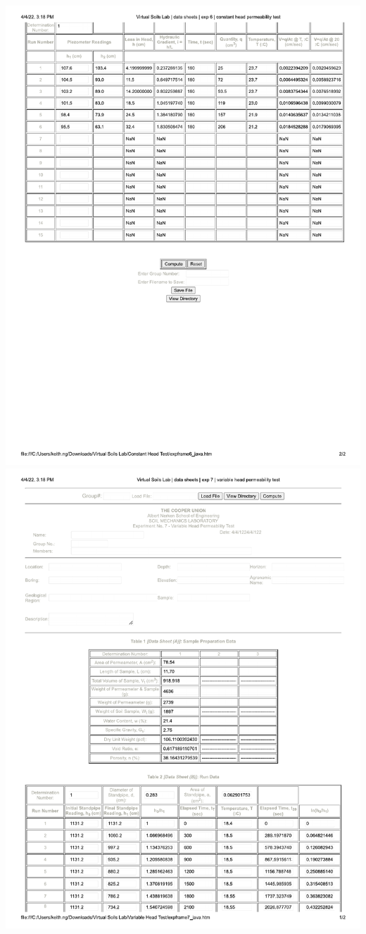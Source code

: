 \documentclass{article}
\begin{document}
\begin{center}
\includegraphics*[scale=0.7]{constant_head_datasheet_2.pdf}
\newpage 
\includegraphics*[scale=0.7]{variable_head_datasheet.pdf}

\end{center}
\end{document}
